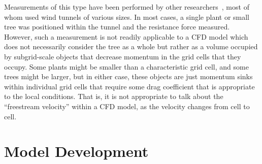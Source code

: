 \documentclass[12pt]{article}
\begin{document}
Measurements of this type have been performed by other researchers~\cite{Cao2012,Jalonen2014,Mayhead1973,Gillies2002,Ishikawa2006}, most of whom used wind tunnels of various sizes. In most cases, a single plant or small tree was positioned within the tunnel and the resistance force measured. However, such a measurement is not readily applicable to a CFD model which does not necessarily consider the tree as a whole but rather as a volume occupied by subgrid-scale objects that decrease momentum in the grid cells that they occupy. Some plants might be smaller than a characteristic grid cell, and some trees might be larger, but in either case, these objects are just momentum sinks within individual grid cells that require some drag coefficient that is appropriate to the local conditions. That is, it is not appropriate to talk about the ``freestream velocity'' within a CFD model, as the velocity changes from cell to cell. 


\section{Model Development}
\label{ssec:headingscap}
\end{document}
